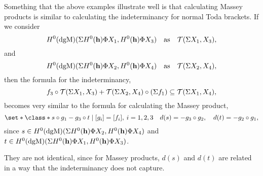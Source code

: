 Something that the above examples illustrate well is that calculating Massey products is similar to calculating the indeterminancy for normal Toda brackets. If we consider
\[
    H^0(\operatorname{dgM})(\Sigma H^0(\mathbf{h}) \Phi X_1, H^0(\mathbf{h}) \Phi X_3) \quad \text{as} \quad {\mathcal{T}}(\Sigma X_1, X_3),
\]
and
\[
    H^0(\operatorname{dgM})(\Sigma H^0(\mathbf{h}) \Phi X_2, H^0(\mathbf{h}) \Phi X_4) \quad \text{as} \quad {\mathcal{T}}(\Sigma X_2, X_4),
\]
then the formula for the indeterminancy,
\[
    f_3 \circ {\mathcal{T}}(\Sigma X_1, X_3)  + {\mathcal{T}}(\Sigma X_2, X_4) \circ (\Sigma f_1) \subseteq {\mathcal{T}}(\Sigma X_1, X_4),
\]
becomes very similar to the formula for calculating the Massey product,
\[
    \set*{
        \class*{
            s \circ g_1 - g_3 \circ t
        }
        \mid [g_i] = [f_i], \: i = 1, 2, 3 \quad
        d(s) = - g_3 \circ g_2, \quad
        d(t) = - g_2 \circ g_1
    },
\]
since \( s \in H^0(\operatorname{dgM})(\Sigma H^0(\mathbf{h}) \Phi X_2, H^0(\mathbf{h}) \Phi X_4) \) and \( t \in H^0(\operatorname{dgM})(\Sigma H^0(\mathbf{h}) \Phi X_1, H^0(\mathbf{h}) \Phi X_3) \).

They are not identical, since for Massey products, \( d(s) \) and \( d(t) \) are related in a way that the indeterminancy does not capture.
